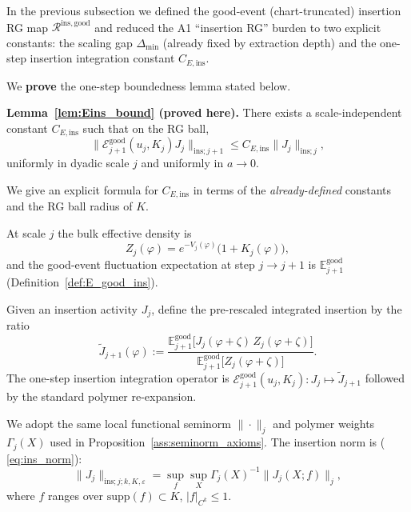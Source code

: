 In the previous subsection we defined the good-event (chart-truncated) insertion RG map $\mathcal R^{\mathrm{ins,good}}$ and reduced the A1 ``insertion RG'' burden to two explicit constants:
the scaling gap $\Delta_{\min}$ (already fixed by extraction depth) and the one-step insertion integration constant $C_{E,\mathrm{ins}}$.

We \textbf{prove} the one-step boundedness lemma stated below.

\medskip
\noindent\textbf{Lemma~\ref{lem:Eins_bound} (proved here).}
There exists a scale-independent constant $C_{E,\mathrm{ins}}$ such that on the RG ball,
\[
\|\mathcal E^{\mathrm{good}}_{j+1}(u_j,K_j)J_j\|_{\mathrm{ins};j+1}\le C_{E,\mathrm{ins}}\|J_j\|_{\mathrm{ins};j},
\]
uniformly in dyadic scale $j$ and uniformly in $a\to0$.

\medskip
We give an explicit formula for $C_{E,\mathrm{ins}}$ in terms of the \emph{already-defined} constants and the RG ball radius of $K$.

At scale $j$ the bulk effective density is
\[
Z_j(\varphi)=e^{-V_j(\varphi)}\big(1+K_j(\varphi)\big),
\]
and the good-event fluctuation expectation at step $j\to j+1$ is $\mathbb E^{\mathrm{good}}_{j+1}$ (Definition~\ref{def:E_good_ins}).

Given an insertion activity $J_j$, define the pre-rescaled integrated insertion by the ratio
\begin{equation}\label{eq:ratio}
\widetilde J_{j+1}(\varphi)
:=
\frac{\mathbb E^{\mathrm{good}}_{j+1}\!\big[J_j(\varphi+\zeta)\,Z_j(\varphi+\zeta)\big]}
{\mathbb E^{\mathrm{good}}_{j+1}\!\big[Z_j(\varphi+\zeta)\big]}.
\end{equation}
The one-step insertion integration operator is $\mathcal E^{\mathrm{good}}_{j+1}(u_j,K_j):J_j\mapsto \widetilde J_{j+1}$ followed by the standard polymer re-expansion.

We adopt the same local functional seminorm $\|\cdot\|_j$ and polymer weights $\Gamma_j(X)$ used in Proposition~\ref{ass:seminorm_axioms}.
The insertion norm is ( \eqref{eq:ins_norm}):
\[
\|J_j\|_{\mathrm{ins};j;k,K,\varepsilon}
=\sup_{f}\sup_{X}\Gamma_j(X)^{-1}\|J_j(X;f)\|_j,
\]
where $f$ ranges over $\mathrm{supp}(f)\subset K$, $|f|_{C^k}\le 1$.

